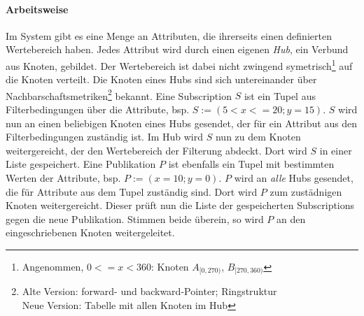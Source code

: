 \paragraph{Arbeitsweise}
Im System gibt es eine Menge an Attributen, die ihrerseits einen definierten Wertebereich haben. Jedes Attribut wird durch einen eigenen \emph{Hub}, ein Verbund aus Knoten, gebildet. Der Wertebereich ist dabei nicht zwingend symetrisch\footnote{Angenommen, $0<=x<360$: Knoten $A_{[0,270)}$, $B_{[270, 360)}$} auf die Knoten verteilt. Die Knoten eines Hubs sind sich untereinander über Nachbarschaftsmetriken\footnote{Alte Version: forward- und backward-Pointer; Ringstruktur\\Neue Version: Tabelle mit allen Knoten im Hub} bekannt.
Eine Subscription $S$ ist ein Tupel aus Filterbedingungen über die Attribute, bsp. $S := (5 < x <= 20; y = 15)$. $S$ wird nun an einen beliebigen Knoten eines Hubs gesendet, der für ein Attribut aus den Filterbedingungen zuständig ist. Im Hub wird $S$ nun zu dem Knoten weitergereicht, der den Wertebereich der Filterung abdeckt. Dort wird $S$ in einer Liste gespeichert.
Eine Publikation $P$ ist ebenfalls ein Tupel mit bestimmten Werten der Attribute, bsp. $P := (x = 10; y = 0)$. $P$ wird an \emph{alle} Hubs gesendet, die für Attribute aus dem Tupel zuständig sind. Dort wird $P$ zum zustädnigen Knoten weitergereicht. Dieser prüft nun die Liste der gespeicherten Subscriptions gegen die neue Publikation. Stimmen beide überein, so wird $P$ an den eingeschriebenen Knoten weitergeleitet.


\cite{BeFiMu2006PubSubQoS}

\cite{PiEyKoSh2007-PubSubAPI}

\cite{KostasKatrinis2005}
